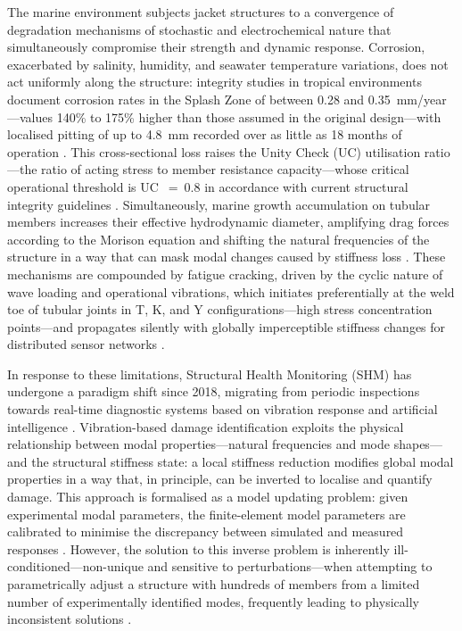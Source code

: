 \documentclass[preprint,12pt]{elsarticle}
\begin{document}
The marine environment subjects jacket structures to a convergence of degradation mechanisms of stochastic and electrochemical nature that simultaneously compromise their strength and dynamic response. Corrosion, exacerbated by salinity, humidity, and seawater temperature variations, does not act uniformly along the structure: integrity studies in tropical environments document corrosion rates in the Splash Zone of between 0.28 and 0.35~mm/year---values 140\% to 175\% higher than those assumed in the original design---with localised pitting of up to 4.8~mm recorded over as little as 18 months of operation \citep{birci2020integrity}. This cross-sectional loss raises the Unity Check (UC) utilisation ratio---the ratio of acting stress to member resistance capacity---whose critical operational threshold is UC~$=~0.8$ in accordance with current structural integrity guidelines \citep{API2014_manual, salama2020shm}. Simultaneously, marine growth accumulation on tubular members increases their effective hydrodynamic diameter, amplifying drag forces according to the Morison equation and shifting the natural frequencies of the structure in a way that can mask modal changes caused by stiffness loss \citep{salama2020shm}. These mechanisms are compounded by fatigue cracking, driven by the cyclic nature of wave loading and operational vibrations, which initiates preferentially at the weld toe of tubular joints in T, K, and Y configurations---high stress concentration points---and propagates silently with globally imperceptible stiffness changes for distributed sensor networks \citep{raza2021fatigue}.

In response to these limitations, Structural Health Monitoring (SHM) has undergone a paradigm shift since 2018, migrating from periodic inspections towards real-time diagnostic systems based on vibration response and artificial intelligence \citep{ghsoub2018structural, mdpi2024shm_wind}. Vibration-based damage identification exploits the physical relationship between modal properties---natural frequencies and mode shapes---and the structural stiffness state: a local stiffness reduction modifies global modal properties in a way that, in principle, can be inverted to localise and quantify damage. This approach is formalised as a model updating problem: given experimental modal parameters, the finite-element model parameters are calibrated to minimise the discrepancy between simulated and measured responses \citep{doebling1996damage}. However, the solution to this inverse problem is inherently ill-conditioned---non-unique and sensitive to perturbations---when attempting to parametrically adjust a structure with hundreds of members from a limited number of experimentally identified modes, frequently leading to physically inconsistent solutions \citep{aghaeidoost2023generalized}.
\end{document}
